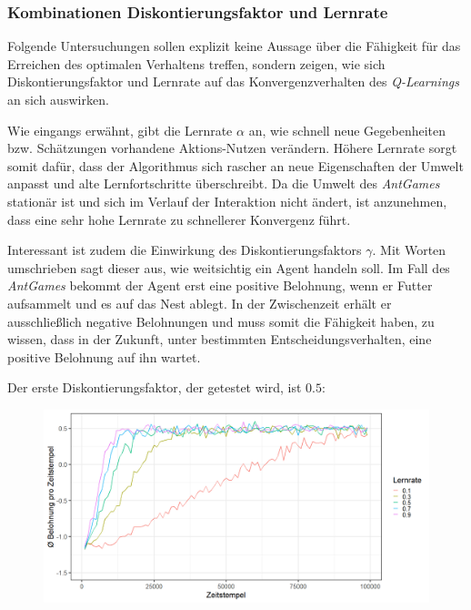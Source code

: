\subsubsection*{Kombinationen Diskontierungsfaktor und Lernrate}
Folgende Untersuchungen sollen explizit keine Aussage über die Fähigkeit für das Erreichen des optimalen Verhaltens treffen, sondern zeigen, wie sich Diskontierungsfaktor und Lernrate auf das Konvergenzverhalten des \textit{Q-Learnings} an sich auswirken.
\par 
Wie eingangs erwähnt, gibt die Lernrate $\alpha$ an, wie schnell neue Gegebenheiten bzw. Schätzungen vorhandene Aktions-Nutzen verändern. Höhere Lernrate sorgt somit dafür, dass der Algorithmus sich rascher an neue Eigenschaften der Umwelt anpasst und alte Lernfortschritte überschreibt. Da die Umwelt des \textit{AntGames} stationär ist und sich im Verlauf der Interaktion nicht ändert, ist anzunehmen, dass eine sehr hohe Lernrate zu schnellerer Konvergenz führt.
\par 
Interessant ist zudem die Einwirkung des Diskontierungsfaktors $\gamma$. Mit Worten umschrieben sagt dieser aus, wie \glqq weitsichtig\grqq{} ein Agent handeln soll. Im Fall des \textit{AntGames} bekommt der Agent erst eine positive Belohnung, wenn er Futter aufsammelt und es auf das Nest ablegt. In der Zwischenzeit erhält er ausschließlich negative Belohnungen und muss somit die Fähigkeit haben, zu wissen, dass in der Zukunft, unter bestimmten Entscheidungsverhalten, eine positive Belohnung auf ihn wartet. 
\par 
Der erste Diskontierungsfaktor, der getestet wird, ist $0.5$:
\begin{figure}[H]
    \centering
    \includegraphics[width=\textwidth]{images/antGameAnalysis05DiscA}
    \label{fig:test1}
\end{figure}
